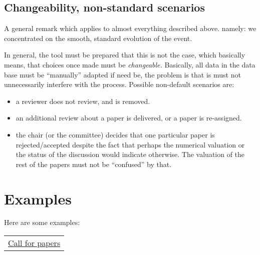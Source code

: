 \subsection{Changeability, non-standard scenarios}

A general remark which applies to almost everything described above.
namely: we concentrated on the smooth, standard evolution of the event.

In general, the tool must be prepared that this is not the case, which
basically means, that choices once made must be \emph{changeable.}
Basically, all data in the data base must be ``manually'' adapted if need
be, the problem is that is must not unnecessarily interfere with the
process. Possible non-default scenarios are:
\begin{itemize}
\item a reviewer does not review, and is removed.
\item an additional review about a paper is delivered, or a paper is re-assigned.
\item the chair (or the committee) decides that one particular paper is
  rejected/accepted despite the fact that perhaps the numerical valuation
  or the status of the discussion would indicate otherwise. The valuation
  of the rest of the papers must not be ``confused'' by that.
\end{itemize}













\ifweb
\appendix



\section{Examples}



Here are some examples:

\begin{tabular}{l}
  \href{../examples/cfpapers.html}{Call for papers}
\end{tabular}

\fi



